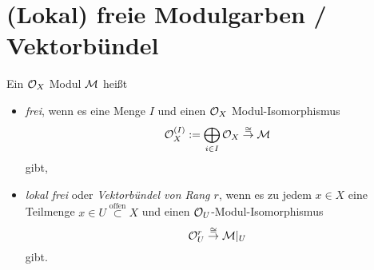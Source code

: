 \section{(Lokal) freie Modulgarben / Vektorbündel}
\begin{defn}
Ein $\mathcal{O}_X$ Modul $\mathcal{M}$ heißt
\begin{itemize}
\item 
\emph{frei}, wenn es eine Menge $I$ und einen $\mathcal{O}_X$ Modul-Isomorphismus 
\[ \mathcal{O}_X^{(I)} := \bigoplus_{i\in I} \mathcal{O}_X \overset{\cong} \to \mathcal{M}\]
gibt,
\item 
\emph{lokal frei} oder \emph{Vektorbündel von Rang $r$}, wenn es zu jedem $x\in
X$ eine Teilmenge $x \in U\overset{\text{offen}}\subset X$ und einen
$\mathcal{O}_U$-Modul-Isomorphismus
\[ \mathcal{O}_U^r \overset{\cong}\to \mathcal{M}|_U\]
gibt.
\end{itemize}
\end{defn}
\begin{comment}
Sei ein Vektorbündel $V\overset{\pi}\to \P^1$ vom Rang $n$ gegeben. Dann setze 
\[ 
\cV : U \mapsto \cV(U) := \{\sigma: U \to \pi^{-1}(U) \subseteq V \mid
  \sigma\text{ stetig, } \pi \circ \sigma = \id_U\}.
\]
Dies ist eine lokal freie $\cO_{\Proj \C[T_0,T_1]}$-Modulgarbe vom Rang $n$.

\begin{defn}
Eine \emph{lokale Trivialisierung} ist ein isomorphismus
\[
\cV|_U\overset{\cong}\to \cO_{\P^1}|_U^n=\cO_U^n
\]
\end{defn}

\begin{defn}[Holomorphes Vektorbündel vom Rang $n$ auf $V$]
\end{defn}
\end{comment}

